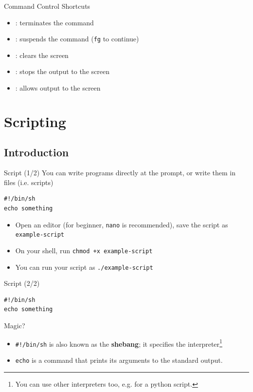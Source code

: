 \documentclass[12pt]{beamer}
\begin{document}
\begin{frame}{Command Control Shortcuts}
  \begin{itemize}
    \item {}: terminates the command
    \item {}: suspends the command (\texttt{fg} to continue)
    \item {}: clears the screen
    \item {}: stops the output to the screen
    \item {}: allows output to the screen
  \end{itemize}
\end{frame}

\section{Scripting}
\subsection{Introduction}

\begin{frame}[fragile]{Script (1/2)}
  You can write programs directly at the prompt, or write them in files (i.e. scripts)
  \begin{verbatim}
#!/bin/sh
echo something
\end{verbatim}
  \begin{itemize}
    \item Open an editor (for beginner, \texttt{nano} is recommended), save the script as \texttt{example-script}
    \item On your shell, run \texttt{chmod +x example-script}
    \item You can run your script as \texttt{./example-script}
  \end{itemize}
\end{frame}

\begin{frame}[fragile]{Script (2/2)}
  \begin{verbatim}
#!/bin/sh
echo something
\end{verbatim}
  Magic?
  \begin{itemize}
    \newsavebox\mybox
    \begin{lrbox}{\mybox}
      {\scriptsize\texttt{#!/usr/bin/env python}}
    \end{lrbox}
    \item \texttt{#!/bin/sh} is also known as the \textbf{shebang}; it specifies the interpreter\footnote{You can use other interpreters too, e.g. \footnotesize\usebox{\mybox} for a python script.}
    \item \texttt{echo} is a command that prints its arguments to the standard output.
  \end{itemize}
\end{frame}
\end{document}
